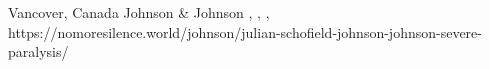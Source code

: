           {
            Vancover, Canada
          }
          {
          }
          {
            Johnson \& Johnson
          }
          {
          }
          {
            ,
            ,
            ,
          }
          {
            https://nomoresilence.world/johnson/julian-schofield-johnson-johnson-severe-paralysis/
          }

